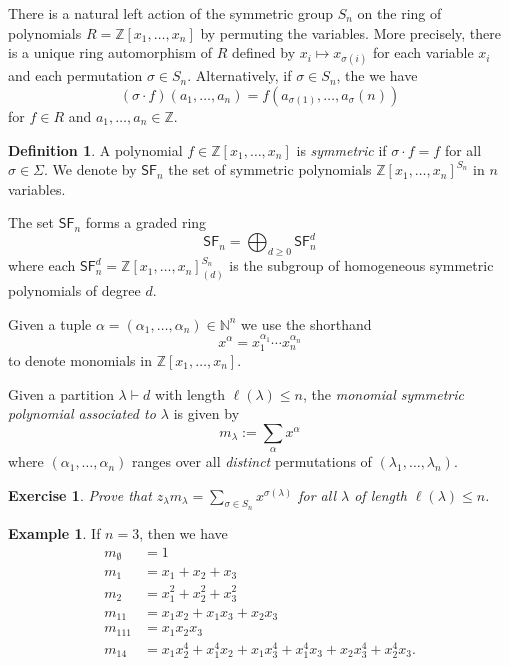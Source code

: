 \documentclass[12pt]{article}
\theoremstyle{plain}
\newtheorem{exercise}[theorem]{Exercise}
\theoremstyle{definition}
\newtheorem{definition}[theorem]{Definition}
\newtheorem{example}[theorem]{Example}
\theoremstyle{remark}
\numberwithin{equation}{section}
\begin{document}
There is a natural left action of the symmetric group $S_n$ on the ring of
polynomials $R=\mathbb{Z}[x_1,\ldots,x_n]$ by permuting the variables.
More precisely, there is a unique ring automorphism of $R$ defined
by $x_i \mapsto x_{\sigma(i)}$ for each variable $x_i$ and each
permutation $\sigma \in S_n$.
Alternatively, if $\sigma \in S_n$, the we have
\[
(\sigma \cdot f)(a_1,\ldots,a_n) =
f\left(a_{\sigma(1)}, \ldots, a_{\sigma}(n)\right)
\]
for $f \in R$ and $a_1,\ldots,a_n \in \mathbb{Z}$.

\begin{definition}
A polynomial $f \in \mathbb{Z}[x_1,\ldots, x_n]$ is \emph{symmetric}
if $\sigma \cdot f = f$ for all $\sigma \in \Sigma$.
We denote by $\mathsf{SF}_n$ the set of symmetric polynomials
$\mathbb{Z}[x_1,\ldots,x_n]^{S_n}$ in $n$ variables.
\end{definition}

The set $\mathsf{SF}_n$ forms a graded ring
\[
\mathsf{SF}_n = \bigoplus_{d \ge 0} \mathsf{SF}_n^d
\]
where each $\mathsf{SF}_n^d = \mathbb{Z}[x_1,\ldots,x_n]_{(d)}^{S_n}$
is the subgroup of homogeneous symmetric polynomials of degree $d$.

Given a tuple $\alpha = (\alpha_1,\ldots,\alpha_n) \in \mathbb{N}^n$
we use the shorthand
\[
x^\alpha = x_1^{\alpha_1} \cdots x_n^{\alpha_n}
\]
to denote monomials in $\mathbb{Z}[x_1,\ldots,x_n]$.

Given a partition $\lambda \vdash d$ with length $\ell(\lambda) \le n$,
the \emph{monomial symmetric polynomial associated to $\lambda$}
is given by
\[
m_\lambda := \sum_{\alpha} x^\alpha
\]
where $(\alpha_1,\ldots,\alpha_n)$ ranges over all
\emph{distinct} permutations of $(\lambda_1,\ldots,\lambda_n)$.

\begin{exercise}
Prove that $\displaystyle z_\lambda m_\lambda = \sum_{\sigma \in S_n}
x^{\sigma(\lambda)}$ for all $\lambda$ of length $\ell(\lambda) \le n$.
\end{exercise}

\begin{example}
If $n=3$, then we have
\begin{align*}
m_\emptyset &= 1\\
m_1 &= x_1 + x_2 + x_3\\
m_2 &= x_1^2 + x_2^2 + x_3^2\\
m_{11} &= x_1x_2 + x_1x_3 + x_2x_3\\
m_{111} &= x_1x_2x_3 \\
m_{14} &= x_1x_2^4 + x_1^4x_2 + x_1x_3^4 + x_1^4x_3 + x_2x_3^4 +
x_2^4x_3.
\end{align*}
\end{example}
\end{document}
